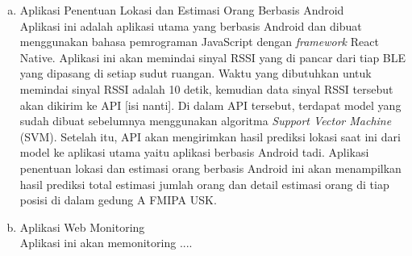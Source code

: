 \begin{enumerate}[a.]







	\item Aplikasi Penentuan Lokasi dan Estimasi Orang Berbasis Android
	      \\ Aplikasi ini adalah aplikasi utama yang berbasis Android dan dibuat menggunakan bahasa pemrograman JavaScript dengan \textit{framework} React Native. Aplikasi ini akan memindai sinyal RSSI yang di pancar dari tiap BLE yang dipasang di setiap sudut ruangan. Waktu yang dibutuhkan untuk memindai sinyal RSSI adalah 10 detik, kemudian data sinyal RSSI tersebut akan dikirim ke API [isi nanti]. Di dalam API tersebut, terdapat model yang sudah dibuat sebelumnya menggunakan algoritma \textit{Support Vector Machine} (SVM). Setelah itu, API akan mengirimkan hasil prediksi lokasi saat ini dari model ke aplikasi utama yaitu aplikasi berbasis Android tadi. Aplikasi penentuan lokasi dan estimasi orang berbasis Android ini akan menampilkan hasil prediksi total estimasi jumlah orang dan detail estimasi orang di tiap posisi di dalam gedung A FMIPA USK.

	\item Aplikasi Web Monitoring
	      \\ Aplikasi ini akan memonitoring ....

\end{enumerate}

